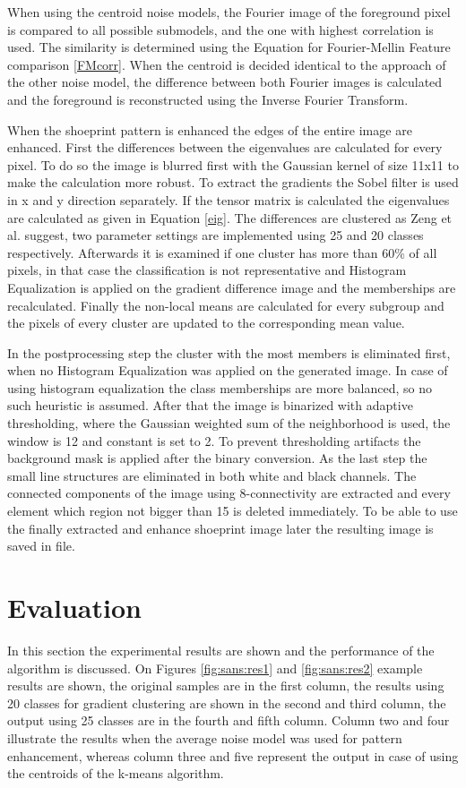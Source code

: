 \documentclass[draft,final]{vutinfth} %
\begin{document}
When using the centroid noise models, the Fourier image of the foreground pixel is compared to all possible submodels, and the one with highest correlation is used.
The similarity is determined using the Equation for Fourier-Mellin Feature comparison \ref{FMcorr}.
When the centroid is decided identical to the approach of the other noise model, the difference between both Fourier images is calculated and the foreground is reconstructed using the Inverse Fourier Transform.
\par
When the shoeprint pattern is enhanced the edges of the entire image are enhanced.
First the differences between the eigenvalues are calculated for every pixel.
To do so the image is blurred first with the Gaussian kernel of size 11x11 to make the calculation more robust.
To extract the gradients the Sobel filter is used in x and y direction separately.
If the tensor matrix is calculated the eigenvalues are calculated as given in Equation \ref{eig}.
The differences are clustered as  Zeng et al. \cite{zeng2011region} suggest, two parameter settings are implemented using 25 and 20 classes respectively.
Afterwards it is examined if one cluster has more than 60\% of all pixels, in that case the classification is not representative and Histogram Equalization is applied on the gradient difference image and the memberships are recalculated.
Finally the non-local means are calculated for every subgroup and the pixels of every cluster are updated to the corresponding mean value.
\par
In the postprocessing step the cluster with the most members is eliminated first, when no Histogram Equalization was applied on the generated image.
In case of using histogram equalization the class memberships are more balanced, so no such heuristic is assumed.
After that the image is binarized with adaptive thresholding, where  the Gaussian weighted sum of the neighborhood is used, the window is 12 and constant is set to 2.
To prevent thresholding artifacts the background mask is applied after the binary conversion.
As the last step the small line structures are eliminated in both white and black channels.
The connected components of the image using 8-connectivity are extracted and every element which region not bigger than 15 is deleted immediately.
To be able to use the finally extracted and enhance shoeprint image later the resulting image is saved in file.

\section{Evaluation}
\par
In this section the experimental results are shown and the performance of the algorithm is discussed.
On Figures \ref{fig:sans:res1} and \ref{fig:sans:res2} example results are shown, the original samples are in the first column, the results using 20 classes for gradient clustering are shown in the second and third column, the output using 25 classes are in the fourth and fifth column.
Column two and four illustrate the results when the average noise model was used for pattern enhancement, whereas column three and five represent the output in case of using the centroids of the k-means algorithm.
\end{document}
